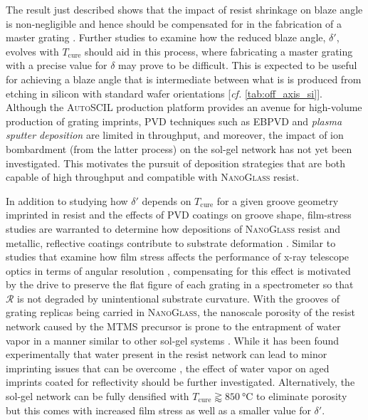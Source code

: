 The result just described shows that the impact of resist shrinkage on blaze angle is non-negligible and hence should be compensated for in the fabrication of a master grating \cite{McCoy20b}. 
Further studies to examine how the reduced blaze angle, $\delta'$, evolves with $T_{\text{cure}}$ should aid in this process, where fabricating a master grating with a precise value for $\delta$ may prove to be difficult. 
This is expected to be useful for achieving a blaze angle that is intermediate between what is is produced from  etching in silicon with standard wafer orientations [\emph{cf.\@} \cref{tab:off_axis_si}]. 
Although the \textsc{AutoSCIL} production platform provides an avenue for high-volume production of grating imprints, PVD techniques such as EBPVD and \emph{plasma sputter deposition} are limited in throughput, and moreover, the impact of ion bombardment (from the latter process) on the sol-gel network has not yet been investigated. 
This motivates the pursuit of deposition strategies that are both capable of high throughput and compatible with \textsc{NanoGlass} resist. 

In addition to studying how $\delta'$ depends on $T_{\text{cure}}$ for a given groove geometry imprinted in resist and the effects of PVD coatings on groove shape, film-stress studies are warranted to determine how depositions of \textsc{NanoGlass} resist and metallic, reflective coatings contribute to substrate deformation \cite{Scheuerman69}. 
Similar to studies that examine how film stress affects the performance of x-ray telescope optics in terms of angular resolution \cite{Chan13,Probst18,Molnar-Fenton19}, compensating for this effect is motivated by the drive to preserve the flat figure of each grating in a spectrometer so that $\mathscr{R}$ is not degraded by unintentional substrate curvature. 
With the grooves of grating replicas being carried in \textsc{NanoGlass}, the nanoscale porosity of the resist network caused by the MTMS precursor is prone to the entrapment of water vapor in a manner similar to other sol-gel systems \cite{Hench90,Brinker90,Vishnevskiy19}. 
While it has been found experimentally that water present in the resist network can lead to minor imprinting issues that can be overcome \cite{Verschuuren10}, the effect of water vapor on aged imprints coated for reflectivity should be further investigated. 
Alternatively, the sol-gel network can be fully densified with $T_{\text{cure}} \gtrapprox \SI{850}{\celsius}$ to eliminate porosity but this comes with increased film stress as well as a smaller value for $\delta'$. %

